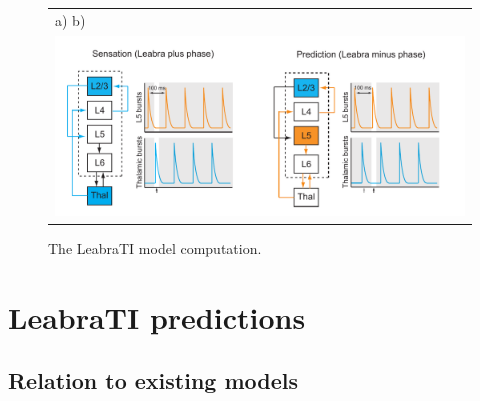 \documentclass[dwyatte_dissertation.tex]{subfiles}
\begin{document}
\begin{figure}[h]
\centering
\begin{tabular}{ll}
a) \hspace{76mm} b) \\
\multicolumn{2}{c}{\includegraphics[width=160mm]{figs/chap_leabrati/leabrati_comp.pdf}} \\
\end{tabular}
\caption{The LeabraTI model computation.}
\label{fig:leabrati_comp}
\end{figure}

\section{LeabraTI predictions}
\subsection{Relation to existing models}
\end{document}
